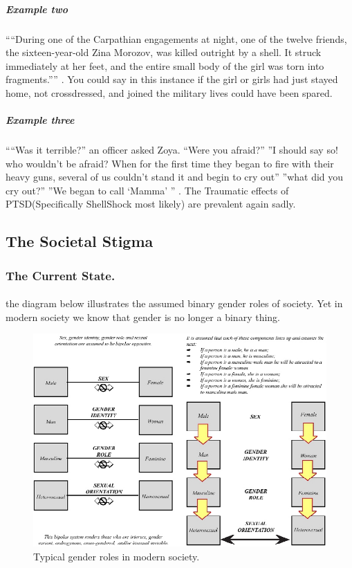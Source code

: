 \subparagraph{Example two}
````During one of the Carpathian engagements at night, one of the twelve
friends, the sixteen-year-old Zina Morozov, was killed outright by a shell. It
struck immediately at her feet, and the entire small body of the girl was torn
into fragments.'''' \cite[p.~366]{YGFRF}. You could say in this instance if the
girl or girls had just stayed home, not crossdressed, and joined the military
lives could have been spared.
\par

\subparagraph{Example three}
````Was it terrible?'' an officer asked Zoya. ``Were you afraid?'' ''I should
say so! who wouldn't be afraid? When for the first time they began to fire with
their heavy guns, several of us couldn't stand it and begin to cry out'' ''what
did you cry out?'' ''We began to call `Mamma' '' \cite[p.~366]{YGFRF}. The
Traumatic effects of PTSD(Specifically ShellShock most likely) are prevalent
again sadly.
\par

\subsection{The Societal Stigma}
\subsubsection{The Current State.}
\paragraph{}
the diagram below illustrates the assumed binary gender roles of society. Yet in
modern society we know that gender is no longer a binary thing.
\par

\begin{figure}[h!]
	\centering{}
		\includegraphics[scale=0.6]{figures/gender-roles}
	\caption{Typical gender roles in modern society.\cite[figure 3.3-3.4]{UDGIE}}
\end{figure}



\newpage
\printbibliography
